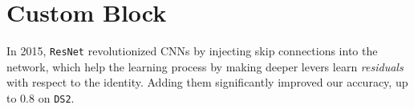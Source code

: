 \documentclass[11pt]{article}
\begin{document}
\begin{multicols}{2}




      \label{sec:custom_block}
      \section{Custom Block}

      In 2015, \texttt{ResNet} revolutionized CNNs by injecting skip connections into the network, which help the learning process by making deeper levers learn \textit{residuals} with respect to the identity. Adding them significantly improved our accuracy, up to $0.8$ on \texttt{DS2}.


\end{multicols}
\end{document}
